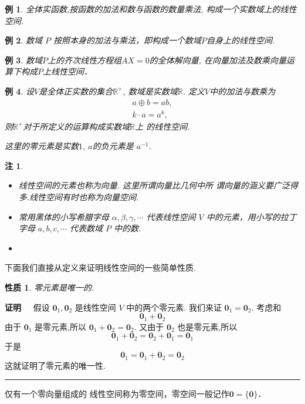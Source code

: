 \documentclass[13pt]{beamer}
\newtheorem{exa}{例}
\newtheorem*{rem}{注}
\def\qed{\nopagebreak\hfill{\rule{4pt}{7pt}}\medbreak}
\def\pf{{\bf 证明~~ }}
\def\0{\mathbf{0}}
\begin{document}
\begin{frame}
\begin{exa}
全体实函数,按函数的加法和数与函数的数量乘法, 构成一个实数域上的线性空间. 
\end{exa}
\begin{exa}
数域 $P$ 按照本身的加法与乘法，即构成一个数域$P$自身上的线性空间. 
\end{exa}


\begin{exa}
数域$P$上的齐次线性方程组$AX=0$的全体解向量, 在向量加法及数乘向量运算下构成$P$上线性空间．
\end{exa}



\end{frame}


\begin{frame}

\begin{exa}
设$V$是全体正实数的集合$\mathbb{R}^{+}$, 数域是实数域$\mathbb{R}$.
定义$V$中的加法与数乘为
\[
\begin{array}{c}
{a} \oplus {b}={a} {b}, \\
{k} \cdot {a}={a}^{k},
\end{array}
\]
则$\mathbb{R}^{+}$对于所定义的运算构成实数域$\mathbb{R}$上 的线性空间.

这里的零元素是实数$1$, $a$的负元素是 $a^{-1}$.	
\end{exa}

\begin{rem}
\begin{itemize}
	\item 线性空间的元素也称为向量. 这里所谓向量比几何中所 谓向量的涵义要广泛得多.线性空间有时也称为向量空间.
	\item 常用黑体的小写希腊字母 ${\alpha}, {\beta}, {\gamma}, \cdots$ 代表线性空间 $V$ 中的元素，用小写的拉丁字母 $a, b, c, \cdots$ 代表数域 $P$ 中的数. 
	\item 
\end{itemize}	
\end{rem}
\end{frame}

\newtheorem{proposition}{性质}


\begin{frame}
下面我们直接从定义来证明线性空间的一些简单性质. 
\begin{proposition}
零元素是唯一的. 
\end{proposition}
\pf 
假设  $\0_{1}, {\0}_{2}$ 是线性空间 $V$ 中的两个零元素. 我们来证 $\0_{1}={\0}_{2}$. 
考虑和
\[
{\0}_{1}+{\0}_{2}
\]
由于  $\0_{1}$ 是零元素,所以 ${\0}_{1}+{\0}_{2}={\0}_{2}$. 
又由于 ${\0}_{2}$ 也是零元素,所以
\[
{\0}_{1}+{\0}_{2}={\0}_{2}+{\0}_{1}={\0}_{1}
\]
于是
\[
{\0}_{1}={\0}_{1}+{\0}_{2}={\0}_{2}
\]
这就证明了零元素的唯一性. \qed

仅有一个零向量组成的 线性空间称为\alert{零空间}，零空间一般记作$\0 = \{\0\}$．
\end{frame}
\end{document}
